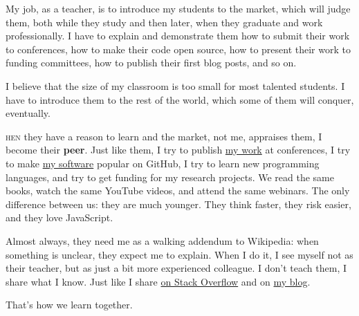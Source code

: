 \documentclass{./yb}
\newcommand\first[2]{\vspace{1em}{\setlength{\parindent}{0pt}\bfseries\LARGE #1}\textsc{#2}}
\begin{document}
My job, as a teacher, is to introduce my students to the market, which will
judge them, both while they study and then later, when they graduate and work
professionally. I have to explain and
demonstrate them how to submit their work to conferences, how to make
their code open source, how to present their work to funding committees,
how to publish their first blog posts, and so on.

I believe that the size of my classroom is too small for most talented students.
I have to introduce them to the rest of the world, which some of them will conquer, eventually.

\first{W}{hen} they have a reason to learn and the market, not me, appraises
them, I become their \textbf{peer}. Just like them, I try to publish
\href{https://www.yegor256.com/papers.html}{my work} at conferences,
I try to make \href{https://github.com/yegor256}{my software}
popular on GitHub, I try to learn new programming
languages, and try to get funding for my research projects.
We read the same books, watch the same YouTube videos, and attend the same webinars.
The only difference between us: they are much younger. They
think faster, they risk easier, and they love JavaScript.

Almost always, they need me as a walking addendum to Wikipedia:
when something is unclear, they expect me to explain. When I do it,
I see myself not as their teacher, but as just a bit more experienced colleague.
I don't teach them, I share what I know. Just like I share
\href{https://stackoverflow.com/users/187141/yegor256}{on Stack Overflow}
and on \href{https://www.yegor256.com}{my blog}.

That's how we learn together.
\end{document}
